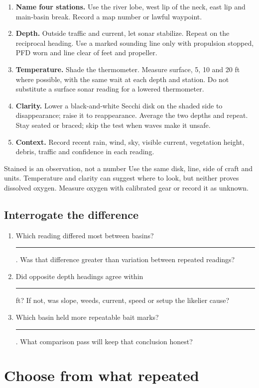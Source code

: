 \begin{enumerate}
\item \textbf{Name four stations.} Use the river lobe, west lip of the neck,
east lip and main-basin break. Record a map number or lawful waypoint.
\item \textbf{Depth.} Outside traffic and current, let sonar stabilize. Repeat
on the reciprocal heading. Use a marked sounding line only with propulsion
stopped, PFD worn and line clear of feet and propeller.
\item \textbf{Temperature.} Shade the thermometer. Measure surface, 5, 10 and
20 ft where possible, with the same wait at each depth and station. Do not
substitute a surface sonar reading for a lowered thermometer.
\item \textbf{Clarity.} Lower a black-and-white Secchi disk on the shaded side
to disappearance; raise it to reappearance. Average the two depths and repeat.
Stay seated or braced; skip the test when waves make it unsafe.
\item \textbf{Context.} Record recent rain, wind, sky, visible current,
vegetation height, debris, traffic and confidence in each reading.
\end{enumerate}

\begin{telospanel}{Stained is an observation, not a number}
Use the same disk, line, side of craft and units. Temperature and clarity can
suggest where to look, but neither proves dissolved oxygen. Measure oxygen with
calibrated gear or record it as unknown.
\end{telospanel}

\subsection{Interrogate the difference}
\begin{enumerate}
\item Which reading differed most between basins? \rule{1.25in}{.4pt}. Was that
difference greater than variation between repeated readings?
\item Did opposite depth headings agree within \rule{.45in}{.4pt} ft? If not,
was slope, weeds, current, speed or setup the likelier cause?
\item Which basin held more repeatable bait marks? \rule{1in}{.4pt}. What
comparison pass will keep that conclusion honest?
\end{enumerate}

\newpage
\section{Choose from what repeated}

